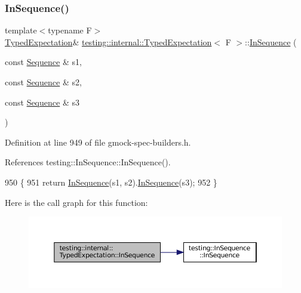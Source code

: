 \subsubsection{\texorpdfstring{In\+Sequence()}{InSequence()}\hspace{0.1cm}{\footnotesize\ttfamily [3/5]}}
{\footnotesize\ttfamily template$<$typename F$>$ \\
\hyperlink{classtesting_1_1internal_1_1TypedExpectation}{Typed\+Expectation}\& \hyperlink{classtesting_1_1internal_1_1TypedExpectation}{testing\+::internal\+::\+Typed\+Expectation}$<$ F $>$\+::\hyperlink{classtesting_1_1InSequence}{In\+Sequence} (\begin{DoxyParamCaption}\item[{const \hyperlink{classtesting_1_1Sequence}{Sequence} \&}]{s1,  }\item[{const \hyperlink{classtesting_1_1Sequence}{Sequence} \&}]{s2,  }\item[{const \hyperlink{classtesting_1_1Sequence}{Sequence} \&}]{s3 }\end{DoxyParamCaption})\hspace{0.3cm}{\ttfamily [inline]}}



Definition at line 949 of file gmock-\/spec-\/builders.\+h.



References testing\+::\+In\+Sequence\+::\+In\+Sequence().


\begin{DoxyCode}
950                                                    \{
951     \textcolor{keywordflow}{return} \hyperlink{classtesting_1_1internal_1_1TypedExpectation_ada9e9081a98435991310ac60483d1230}{InSequence}(s1, s2).\hyperlink{classtesting_1_1internal_1_1TypedExpectation_ada9e9081a98435991310ac60483d1230}{InSequence}(s3);
952   \}
\end{DoxyCode}
Here is the call graph for this function\+:
\nopagebreak
\begin{figure}[H]
\begin{center}
\leavevmode
\includegraphics[width=350pt]{classtesting_1_1internal_1_1TypedExpectation_a17cfbb9db111e0ded254759664e78d73_cgraph}
\end{center}
\end{figure}
\mbox{\label{classtesting_1_1internal_1_1TypedExpectation_aa60bae1cf536651dc5efcd8110bea4fd}} 
